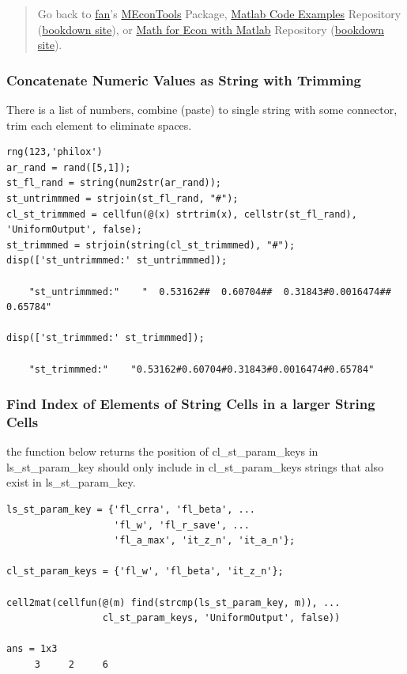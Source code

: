 \documentclass[
]{book}
\begin{document}
\begin{quote}
Go back to \href{http://fanwangecon.github.io/}{fan}'s \href{https://fanwangecon.github.io/MEconTools/}{MEconTools} Package, \href{https://fanwangecon.github.io/M4Econ/}{Matlab Code Examples} Repository (\href{https://fanwangecon.github.io/M4Econ/bookdown}{bookdown site}), or \href{https://fanwangecon.github.io/Math4Econ/}{Math for Econ with Matlab} Repository (\href{https://fanwangecon.github.io/Math4Econ/bookdown}{bookdown site}).
\end{quote}

\hypertarget{concatenate-numeric-values-as-string-with-trimming}{%
\subsubsection{Concatenate Numeric Values as String with Trimming}\label{concatenate-numeric-values-as-string-with-trimming}}

There is a list of numbers, combine (paste) to single string with some
connector, trim each element to eliminate spaces.

\begin{verbatim}
rng(123,'philox')
ar_rand = rand([5,1]);
st_fl_rand = string(num2str(ar_rand));
st_untrimmmed = strjoin(st_fl_rand, "#");
cl_st_trimmmed = cellfun(@(x) strtrim(x), cellstr(st_fl_rand), 'UniformOutput', false);
st_trimmmed = strjoin(string(cl_st_trimmmed), "#");
disp(['st_untrimmmed:' st_untrimmmed]);

    "st_untrimmmed:"    "  0.53162##  0.60704##  0.31843#0.0016474##  0.65784"

disp(['st_trimmmed:' st_trimmmed]);

    "st_trimmmed:"    "0.53162#0.60704#0.31843#0.0016474#0.65784"
\end{verbatim}

\hypertarget{find-index-of-elements-of-string-cells-in-a-larger-string-cells}{%
\subsubsection{Find Index of Elements of String Cells in a larger String Cells}\label{find-index-of-elements-of-string-cells-in-a-larger-string-cells}}

the function below returns the position of cl\_st\_param\_keys in
ls\_st\_param\_key should only include in cl\_st\_param\_keys strings that
also exist in ls\_st\_param\_key.

\begin{verbatim}
ls_st_param_key = {'fl_crra', 'fl_beta', ...
                   'fl_w', 'fl_r_save', ...
                   'fl_a_max', 'it_z_n', 'it_a_n'};

cl_st_param_keys = {'fl_w', 'fl_beta', 'it_z_n'};

cell2mat(cellfun(@(m) find(strcmp(ls_st_param_key, m)), ...
                 cl_st_param_keys, 'UniformOutput', false))

ans = 1x3    
     3     2     6
\end{verbatim}
\end{document}
